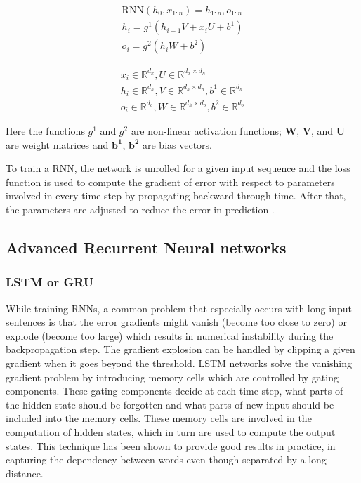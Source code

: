 \documentclass[a4paper, 11pt]{article}
\begin{document}
\begin{align*}
\mathrm{RNN}(h_0,x_{1:n}) = h_{1:n}, o_{1:n} \\
h_i = g^1(h_{i-1}V + x_iU + b^1) \\
o_i = g^2(h_iW + b^2) 
\end{align*}

\begin{align*}
x_i \in \mathbb{R}^{d_x}, U \in \mathbb{R}^{d_x \times d_h} \\
h_i \in \mathbb{R}^{d_h}, V \in \mathbb{R}^{d_h \times d_h}, b^1 \in \mathbb{R}^{d_h} \\
o_i \in \mathbb{R}^{d_o}, W \in \mathbb{R}^{d_h \times d_o}, b^2 \in \mathbb{R}^{d_o}
\end{align*}

Here the functions $g^{1}$ and $g^{2}$ are non-linear activation functions; $\mathbf{W}$, $\mathbf{V}$, and $\mathbf{U}$ are weight matrices and $\mathbf{b^{1}}$, $\mathbf{b^{2}}$ are bias vectors. 

To train a RNN, the network is unrolled for a given input sequence and the loss function is used to compute the gradient of error with respect to parameters involved in every time step by propagating backward through time. After that, the parameters are adjusted to reduce the error in prediction \parencite{Werbos1990}. 

\subsection{Advanced Recurrent Neural networks }

\subsubsection{LSTM or GRU}

While training RNNs, a common problem that especially occurs with long input sentences is that the error gradients might vanish (become too close to zero) or explode (become too large) which results in numerical instability during the backpropagation step. The gradient explosion can be handled by clipping a given gradient when it goes beyond the threshold. LSTM networks \parencite{Hochreiter1997} solve the vanishing gradient problem by introducing memory cells which are controlled by gating components. These gating components decide at each time step, what parts of the hidden state should be forgotten and what parts of new input should be included into the memory cells. These memory cells are involved in the computation of hidden states, which in turn are used to compute the output states. This technique has been shown to provide good results in practice, in capturing the dependency between words even though separated by a long distance.
\end{document}
